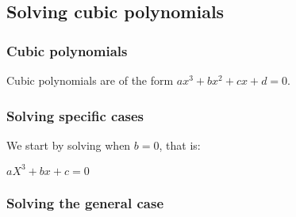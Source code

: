 \subsection{Solving cubic polynomials}

\subsubsection{Cubic polynomials}

Cubic polynomials are of the form \(ax^3+bx^2+cx+d=0\).

\subsubsection{Solving specific cases}

We start by solving when \(b=0\), that is:

\(aX^3+bx+c=0\)

\subsubsection{Solving the general case}

